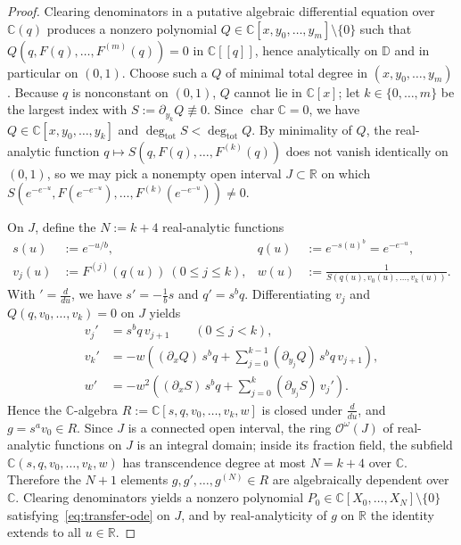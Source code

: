 \documentclass[10pt,reqno]{amsart}
\numberwithin{equation}{section}
\theoremstyle{definition}
\newcommand{\R}{\mathbb{R}}
\newcommand{\C}{\mathbb{C}}
\newcommand{\D}{\mathbb{D}}
\newcommand{\cO}{\mathcal{O}}
\begin{document}
\begin{proof}
Clearing denominators in a putative algebraic differential equation over $\C(q)$ produces a nonzero polynomial $Q \in \C[x, y_0, \dots, y_m] \setminus \{0\}$ such that $Q(q, F(q), \dots, F^{(m)}(q)) = 0$ in $\C[[q]]$, hence analytically on $\D$ and in particular on $(0,1)$. Choose such a $Q$ of minimal total degree in $(x, y_0, \dots, y_m)$. Because $q$ is nonconstant on $(0,1)$, $Q$ cannot lie in $\C[x]$; let $k \in \{0, \dots, m\}$ be the largest index with $S := \partial_{y_k} Q \not\equiv 0$. Since $\operatorname{char}\C = 0$, we have $Q \in \C[x, y_0, \dots, y_k]$ and $\deg_{\mathrm{tot}} S < \deg_{\mathrm{tot}} Q$. By minimality of $Q$, the real-analytic function $q \mapsto S(q, F(q), \dots, F^{(k)}(q))$ does not vanish identically on $(0,1)$, so we may pick a nonempty open interval $J \subset \R$ on which $S(e^{-e^{-u}}, F(e^{-e^{-u}}), \dots, F^{(k)}(e^{-e^{-u}})) \neq 0$.

On $J$, define the $N := k + 4$ real-analytic functions
\begin{align*}
  s(u) &:= e^{-u/b}, & q(u) &:= e^{-s(u)^b} = e^{-e^{-u}}, \\
  v_j(u) &:= F^{(j)}(q(u)) \ (0 \le j \le k), & w(u) &:= \frac{1}{S(q(u), v_0(u), \dots, v_k(u))}.
\end{align*}
With $' = \frac{d}{du}$, we have $s' = -\frac{1}{b} s$ and $q' = s^b q$. Differentiating $v_j$ and $Q(q, v_0, \dots, v_k) = 0$ on $J$ yields
\begin{align*}
  v_j' &= s^b q\, v_{j+1} \qquad (0 \le j < k), \\
  v_k' &= -w \left((\partial_x Q)\, s^b q + \sum_{j=0}^{k-1} (\partial_{y_j} Q)\, s^b q\, v_{j+1}\right), \\
  w' &= -w^2 \left((\partial_x S)\, s^b q + \sum_{j=0}^{k} (\partial_{y_j} S)\, v_j'\right).
\end{align*}
Hence the $\C$-algebra $R := \C[s, q, v_0, \dots, v_k, w]$ is closed under $\frac{d}{du}$, and $g = s^a v_0 \in R$. Since $J$ is a connected open interval, the ring $\cO^\omega(J)$ of real-analytic functions on $J$ is an integral domain; inside its fraction field, the subfield $\C(s, q, v_0, \dots, v_k, w)$ has transcendence degree at most $N = k + 4$ over $\C$. Therefore the $N + 1$ elements $g, g', \dots, g^{(N)} \in R$ are algebraically dependent over $\C$. Clearing denominators yields a nonzero polynomial $P_0 \in \C[X_0, \dots, X_N] \setminus \{0\}$ satisfying~\eqref{eq:transfer-ode} on $J$, and by real-analyticity of $g$ on $\R$ the identity extends to all $u \in \R$.
\end{proof}
\end{document}
